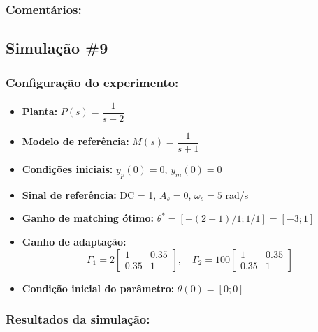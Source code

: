 \documentclass[10pt]{article}
\begin{document}
\subsubsection{Comentários:}

\newpage

\subsection{Simulação \#9}
\subsubsection{Configuração do experimento:}
\begin{itemize}
\item \textbf{Planta:} $P(s) = \dfrac{1}{s - 2}$
\item \textbf{Modelo de referência:} $M(s) = \dfrac{1}{s + 1}$
\item \textbf{Condições iniciais:} $y_p(0)=0$, $y_m(0)=0$
\item \textbf{Sinal de referência:} DC = 1, $A_s=0$, $\omega_s=5$ rad/s
\item \textbf{Ganho de matching ótimo:} $\theta^* = [-(2+1)/1;1/1] = [-3;1]$
\item \textbf{Ganho de adaptação:} 
\[
\Gamma_1 = 2 \begin{bmatrix} 1 & 0.35 \\ 0.35 & 1 \end{bmatrix}, \quad
\Gamma_2 = 100 \begin{bmatrix} 1 & 0.35 \\ 0.35 & 1 \end{bmatrix}
\]
\item \textbf{Condição inicial do parâmetro:} $\theta(0) = [0;0]$
\end{itemize}

\subsubsection{Resultados da simulação:}
\end{document}
